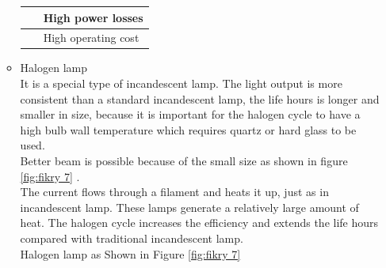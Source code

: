 \documentclass[12pt,fleqn]{book} %
\begin{document}
\begin{enumerate}
\begin{itemize}
\begin{table}[!h]
\begin{tabular}{!{\color[rgb]{0.584,0.702,0.843}\vrule}l!{\color{black}\vrule}l!{\color[rgb]{0.584,0.702,0.843}\vrule}}
\hline
~                                                                                                                                                                                           & High power losses                                                                                    \\ 
\hline
{} ~                                                                                                                                                         & High operating cost                                                                                  \\
\hline
\end{tabular}
\end{table}
       \item Halogen lamp
     \\  It is a special type of incandescent lamp. The light output is more consistent than a standard incandescent lamp, the life hours is longer and smaller in size, because it is important for the halogen cycle to have a high bulb wall temperature which requires quartz or hard glass to be used.\\
       Better beam is possible because of the small size as shown in figure \ref{fig:fikry 7} .\\
       The current flows through a filament and heats it up, just as in incandescent lamp. These lamps
       generate a relatively large amount of heat. The halogen cycle increases the efficiency and extends the life hours compared with traditional incandescent lamp.\\
       Halogen lamp as Shown in Figure \ref{fig:fikry 7}
       

\end{itemize}
\end{enumerate}
\end{document}
